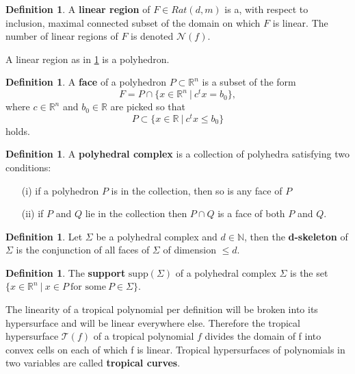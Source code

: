 \documentclass{article}
\theoremstyle{definition}
\newtheorem{definition}[theorem]{Definition}
\begin{document}
\begin{definition}\hspace{1sp}\cite[p.~4]{zhang2018tropical}
\label{def:lin_reg_of}
A \textbf{linear region} of $F \in Rat(d, m)$ is a, with respect to inclusion, maximal connected subset of the domain on which $F$ is linear. The number of linear regions of $F$ is denoted $\mathcal{N}(f)$.
\end{definition}
A linear region as in \ref{def:lin_reg_of} is a polyhedron.
\begin{definition}
A \textbf{face} of a polyhedron $P \subset \mathbb{R}^{n}$ is a subset of the form
$$F= P \cap \{x \in \mathbb{R}^{n} \ | \ c^{t}x = b_0 \},$$
where $c \in \mathbb{R}^{n}$ and $b_0 \in \mathbb{R}$ are picked so that
$$P \subset \{ x \in \mathbb{R} \ | \ c^{t}x \leq b_0 \}$$
holds.
\end{definition}

\begin{definition}\hspace{1sp}\cite{maclagan2015introduction}
A \textbf{polyhedral complex} is a collection of polyhedra satisfying two conditions:
\begin{itemize}
\item[(i)]
if a polyhedron $P$ is in the collection, then so is any face of $P$
\item[(ii)]
if $P$ and $Q$ lie in the collection then $P \cap Q$ is a face of both $P$ and $Q$.
\end{itemize}
\end{definition}
\begin{definition}
Let $\Sigma$ be a polyhedral complex and $d \in \mathbb{N}$, then the \textbf{d-skeleton} of $\Sigma$ is the conjunction of all faces of $\Sigma$ of dimension $\leq d$.
\end{definition}
\begin{definition}\hspace{1sp}\cite{maclagan2015introduction}
The \textbf{support} $\text{supp}(\Sigma)$ of a polyhedral complex $\Sigma$ is the set $\{ x \in \mathbb{R}^{n} \ | \ x \in P \ \text{for some} \ P \in \Sigma \}.$
\end{definition}


The linearity of a tropical polynomial per definition will be broken into its hypersurface and will be linear everywhere else. Therefore the tropical hypersurface $\mathcal{T}(f)$ of a tropical polynomial $f$ divides the domain of f into convex cells on each of which f is linear. Tropical hypersurfaces of polynomials in two variables are called \textbf{tropical curves}.\cite[p.~3]{zhang2018tropical}
\end{document}
